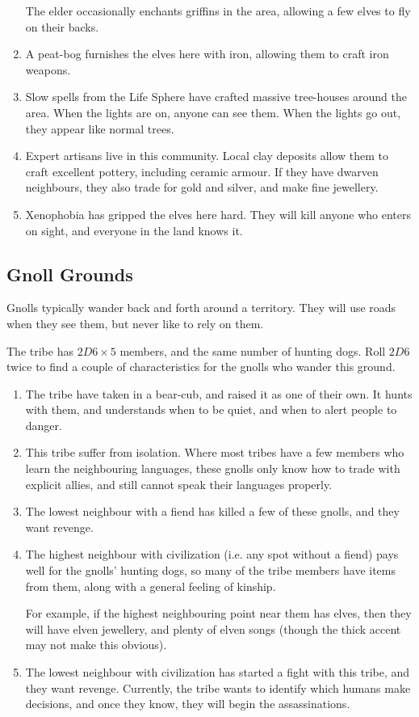 \begin{multicols}{2}
\begin{enumerate}
  The elder occasionally enchants griffins in the area, allowing a few elves to fly on their backs.
  \item
  A peat-bog furnishes the elves here with iron, allowing them to craft iron weapons.
  \item
  Slow spells from the Life Sphere have crafted massive tree-houses around the area.
  When the lights are on, anyone can see them.
  When the lights go out, they appear like normal trees.
  \item
  Expert artisans live in this community.
  Local clay deposits allow them to craft excellent pottery, including ceramic armour.
  If they have dwarven neighbours, they also trade for gold and silver, and make fine jewellery.
  \item
  Xenophobia has gripped the elves here hard.
  They will kill anyone who enters on sight, and everyone in the land knows it.
\end{enumerate}

\subsection{Gnoll Grounds}

Gnolls typically wander back and forth around a territory.
They will use roads when they see them, but never like to rely on them.

The tribe has $2D6 \times 5$ members, and the same number of hunting dogs.
Roll $2D6$ twice to find a couple of characteristics for the gnolls who wander this ground.

\begin{enumerate}
  \item
  The tribe have taken in a bear-cub, and raised it as one of their own.
  It hunts with them, and understands when to be quiet, and when to alert people to danger.
  \item
  This tribe suffer from isolation.
  Where most tribes have a few members who learn the neighbouring languages, these gnolls only know how to trade with explicit allies, and still cannot speak their languages properly.
  \item
  The lowest neighbour with a fiend has killed a few of these gnolls, and they want revenge.
  \item
  The highest neighbour with civilization (i.e. any spot without a fiend) pays well for the gnolls' hunting dogs, so many of the tribe members have items from them, along with a general feeling of kinship.

  For example, if the highest neighbouring point near them has elves, then they will have elven jewellery, and plenty of elven songs (though the thick accent may not make this obvious).
  \item
  The lowest neighbour with civilization has started a fight with this tribe, and they want revenge.
  Currently, the tribe wants to identify which humans make decisions, and once they know, they will begin the assassinations.


\end{enumerate}
\end{multicols}
